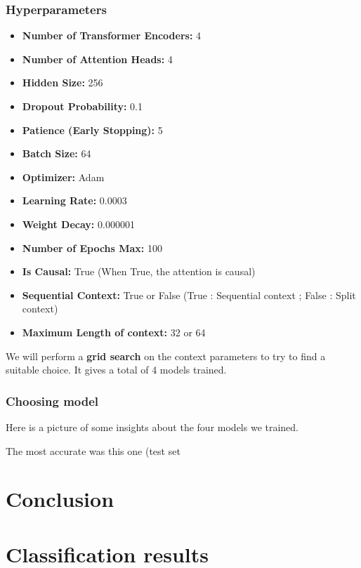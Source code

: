 \documentclass{article}
\begin{document}
\subsubsection{Hyperparameters}\label{cpc_hyperparams}
\begin{itemize}
    \item \textbf{Number of Transformer Encoders:} 4
    \item \textbf{Number of Attention Heads:} 4
    \item \textbf{Hidden Size:} 256
    \item \textbf{Dropout Probability:} 0.1
    \item \textbf{Patience (Early Stopping):} 5
    \item \textbf{Batch Size:} 64
    \item \textbf{Optimizer:} Adam
    \item \textbf{Learning Rate:} 0.0003
    \item \textbf{Weight Decay:} 0.000001
    \item \textbf{Number of Epochs Max:} 100
    \item \textbf{Is Causal:} True (When True, the attention is causal)
    \item \textbf{Sequential Context:} True or False (True : Sequential context ; False : Split context)
    \item \textbf{Maximum Length of context:} 32 or 64
\end{itemize}

We will perform a \textbf{grid search} on the context parameters to try to find a suitable choice. It gives a total of 4 models trained.

\subsubsection{Choosing model}
Here is a picture of some insights about the four models we trained.

The most accurate was this one (test set
\section{Conclusion}

\medskip

\newpage

\printbibliography

\newpage

\appendix

\section{Classification results}
\end{document}
